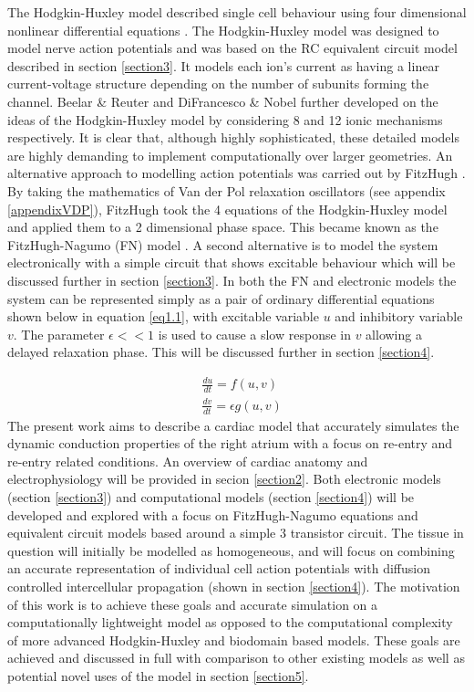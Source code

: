 The Hodgkin-Huxley model described single cell behaviour using four dimensional nonlinear differential equations \citep{hodgkinhuxley}. The Hodgkin-Huxley model was designed to model nerve action potentials and was based on the RC equivalent circuit model described in section \ref{section3}. It models each ion's current as having a linear current-voltage structure depending on the number of subunits forming the channel. Beelar \& Reuter \citep{beelerreuter} and DiFrancesco \& Nobel \citep{difrancesconobel} further developed on the ideas of the Hodgkin-Huxley model by considering 8 and 12 ionic mechanisms respectively. It is clear that, although highly sophisticated, these detailed models are highly demanding to implement computationally over larger geometries. An alternative approach to modelling action potentials was carried out by FitzHugh \citep{fitzhugh}. By taking the mathematics of Van der Pol relaxation oscillators (see appendix \ref{appendixVDP}), FitzHugh took the 4 equations of the Hodgkin-Huxley model and applied them to a 2 dimensional phase space. This became known as the FitzHugh-Nagumo (FN) model \citep{fitzhughnagumo}. A second alternative is to model the system electronically with a simple circuit that shows excitable behaviour which will be discussed further in section \ref{section3}. In both the FN and electronic models the system can be represented simply as a pair of ordinary differential equations shown below in equation \ref{eq1.1}, with excitable variable $u$ and inhibitory variable $v$. The parameter $\epsilon <<1$ is used to cause a slow response in $v$ allowing a delayed relaxation phase. This will be discussed further in section \ref{section4}.\par
\begin{equation}
    \begin{split}
    & \frac{du}{dt} = f(u,v) \\
    & \frac{dv}{dt} = \epsilon g(u,v)
    \end{split}
    \label{eq1.1}
\end{equation}
The present work aims to describe a cardiac model that accurately simulates the dynamic conduction properties of the right atrium with a focus on re-entry and re-entry related conditions. An overview of cardiac anatomy and electrophysiology will be provided in secion \ref{section2}. Both electronic models (section \ref{section3}) and computational models (section \ref{section4}) will be developed and explored with a focus on FitzHugh-Nagumo equations and equivalent circuit models based around a simple 3 transistor circuit. The tissue in question will initially be modelled as homogeneous, and will focus on combining an accurate representation of individual cell action potentials with diffusion controlled intercellular propagation (shown in section \ref{section4}). The motivation of this work is to achieve these goals and accurate simulation on a computationally lightweight model as opposed to the computational complexity of more advanced Hodgkin-Huxley and biodomain based models. These goals are achieved and discussed in full with comparison to other existing models as well as potential novel uses of the model in section \ref{section5}.